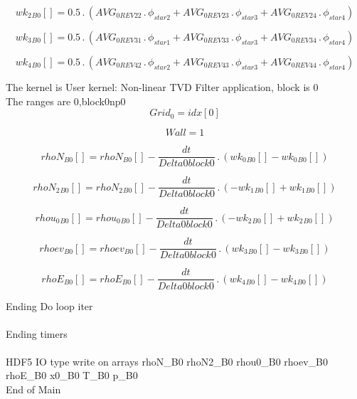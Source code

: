 \documentclass{article}
\begin{document}
\begin{dmath}{wk_{2}{_{B0}}}[{}] = 0.5 \,.\, \left(AVG_{0 REV 22} \,.\, \phi_{star 2} + AVG_{0 REV 23} \,.\, \phi_{star 3} + AVG_{0 REV 24} \,.\, \phi_{star 4}\right)\end{dmath}

\begin{dmath}{wk_{3}{_{B0}}}[{}] = 0.5 \,.\, \left(AVG_{0 REV 31} \,.\, \phi_{star 1} + AVG_{0 REV 33} \,.\, \phi_{star 3} + AVG_{0 REV 34} \,.\, \phi_{star 4}\right)\end{dmath}

\begin{dmath}{wk_{4}{_{B0}}}[{}] = 0.5 \,.\, \left(AVG_{0 REV 42} \,.\, \phi_{star 2} + AVG_{0 REV 43} \,.\, \phi_{star 3} + AVG_{0 REV 44} \,.\, \phi_{star 4}\right)\end{dmath}

\noindent The kernel is User kernel: Non-linear TVD Filter application, block is 0\\\noindent The ranges are 0,block0np0\\\begin{dmath}Grid_{0} = {idx}[{0}]\end{dmath}

\begin{dmath}Wall = 1\end{dmath}

\begin{dmath}{rhoN{_{B0}}}[{}] = {rhoN{_{B0}}}[{}] - \frac{dt}{Delta0block0} \,.\, \left({wk_{0}{_{B0}}}[{}] - {wk_{0}{_{B0}}}[{}]\right)\end{dmath}

\begin{dmath}{rhoN_{2}{_{B0}}}[{}] = {rhoN_{2}{_{B0}}}[{}] - \frac{dt}{Delta0block0} \,.\, \left(- {wk_{1}{_{B0}}}[{}] + {wk_{1}{_{B0}}}[{}]\right)\end{dmath}

\begin{dmath}{rhou_{0}{_{B0}}}[{}] = {rhou_{0}{_{B0}}}[{}] - \frac{dt}{Delta0block0} \,.\, \left(- {wk_{2}{_{B0}}}[{}] + {wk_{2}{_{B0}}}[{}]\right)\end{dmath}

\begin{dmath}{rhoev{_{B0}}}[{}] = {rhoev{_{B0}}}[{}] - \frac{dt}{Delta0block0} \,.\, \left({wk_{3}{_{B0}}}[{}] - {wk_{3}{_{B0}}}[{}]\right)\end{dmath}

\begin{dmath}{rhoE{_{B0}}}[{}] = {rhoE{_{B0}}}[{}] - \frac{dt}{Delta0block0} \,.\, \left({wk_{4}{_{B0}}}[{}] - {wk_{4}{_{B0}}}[{}]\right)\end{dmath}

\noindent Ending Do loop iter\\
\\\noindent Ending timers\\
\\\noindent HDF5 IO type write on arrays rhoN_B0 rhoN2_B0 rhou0_B0 rhoev_B0 rhoE_B0 x0_B0 T_B0 p_B0\\\noindent End of Main\\
\end{document}
